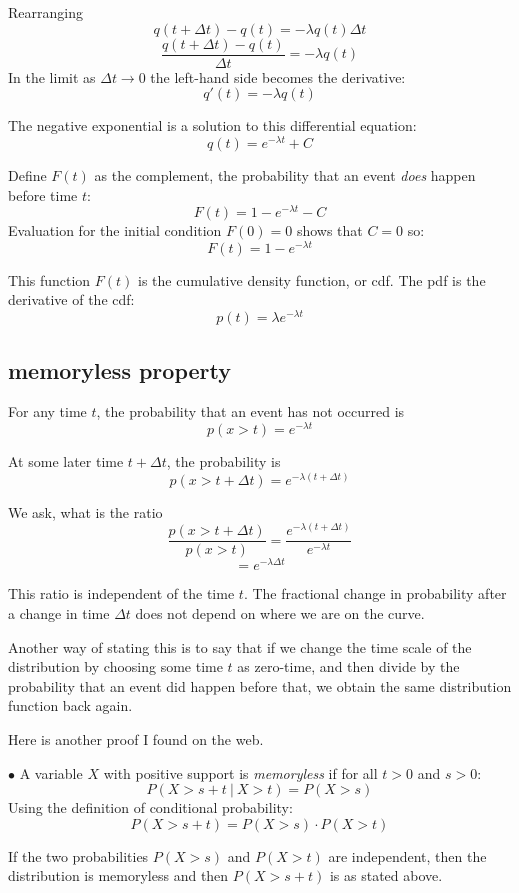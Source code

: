 \documentclass[11pt, oneside]{article}   	%
\begin{document}
Rearranging
\[ q(t + \Delta t) - q(t) = - \lambda q(t) \Delta t \]
\[ \frac{q(t + \Delta t) - q(t)}{\Delta t} = - \lambda q(t) \]
In the limit as $\Delta t \rightarrow 0$ the left-hand side becomes the derivative:
\[ q'(t) = -  \lambda q(t) \]

The negative exponential is a solution to this differential equation:
\[ q(t) = e^{-\lambda t} + C \]

Define $F(t)$ as the complement, the probability that an event \emph{does} happen before time $t$:
\[ F(t) = 1 - e^{-\lambda t} - C \]
Evaluation for the initial condition $F(0) = 0$ shows that $C = 0$ so:
\[ F(t) = 1 - e^{-\lambda t} \]

This function $F(t)$ is the cumulative density function, or cdf.  The pdf is the derivative of the cdf:
\[ p(t) = \lambda e^{-\lambda t} \]

\subsection*{memoryless property}

For any time $t$, the probability that an event has not occurred is
\[ p(x > t) = e^{-\lambda t}  \]

At some later time $t + \Delta t$, the probability is
\[ p(x > t + \Delta t) = e^{-\lambda (t + \Delta t)}  \]

We ask, what is the ratio 
\[ \frac{ p(x > t + \Delta t) }{ p(x > t) } =  \frac{e^{-\lambda (t + \Delta t)} } {  e^{-\lambda t}} \]
\[ = e^{-\lambda \Delta t} \]

This ratio is independent of the time $t$.  The fractional change in probability after a change in time $\Delta t$ does not depend on where we are on the curve.

Another way of stating this is to say that if we change the time scale of the distribution by choosing some time $t$ as zero-time, and then divide by the probability that an event did happen before that, we obtain the same distribution function back again.

Here is another proof I found on the web.

$\bullet$ A variable $X$ with positive support is \emph{memoryless} if for all $t > 0$ and $s > 0$:
\[ P(X > s+t \ | \ X > t) = P(X > s) \]
Using the definition of conditional probability:
\[ P(X > s+t) = P(X > s) \cdot P(X > t) \]

If the two probabilities $P(X > s)$ and $P(X > t)$ are independent, then the distribution is memoryless and then $P(X > s + t)$ is as stated above.
\end{document}
